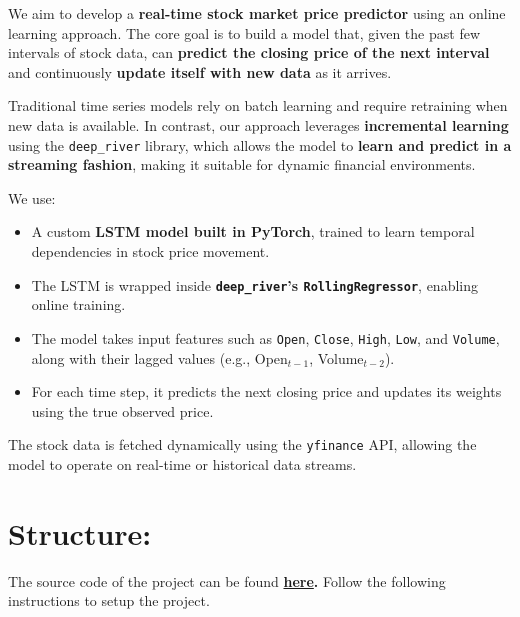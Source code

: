 \documentclass{article}
\begin{document}
 {\noindent \fontsize{12}{16}\selectfont We aim to develop a \textbf{real-time
      stock market
      price predictor} using an online learning approach. The core goal is to
  build a
  model that, given the past few intervals of stock data, can \textbf{predict
      the
      closing price of the next interval} and continuously \textbf{update
      itself with
      new data} as it arrives.

  Traditional time series models rely on batch learning and require
  retraining
  when new data is available. In contrast, our approach leverages
  \textbf{incremental learning} using the \texttt{deep\_river} library,
  which
  allows the model to \textbf{learn and predict in a streaming fashion},
  making
  it suitable for dynamic financial environments.

  We use:
  \begin{itemize}
      \item A custom \textbf{LSTM model built in PyTorch}, trained to learn
            temporal dependencies in stock price movement.
      \item The LSTM is wrapped inside \textbf{\texttt{deep\_river}'s\space
                \texttt{RollingRegressor}}, enabling online training.
      \item The model takes input features such as \texttt{Open},
            \texttt{Close},
            \texttt{High}, \texttt{Low}, and \texttt{Volume}, along with
            their lagged
            values (e.g., Open$_{t-1}$, Volume$_{t-2}$).
      \item For each time step, it predicts the next closing price and
            updates
            its weights using the true observed price.
  \end{itemize}

  The stock data is fetched dynamically using the \texttt{yfinance} API,
  allowing the model to operate on real-time or historical data streams.

 }

\section*{\fontsize{20}{20}\selectfont Structure:}

{\fontsize{14}{20} \selectfont The source code of the project can be found
\textbf{\href{https://drive.google.com/file/d/1W9iylU5aluezGqYUcOf1AgIQyAChNvWV}{here}.} Follow the following instructions to setup the project.
}
\newpage
\end{document}
